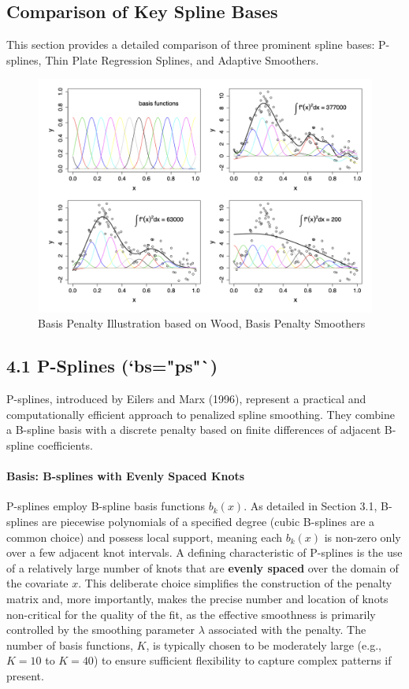 \documentclass[11pt, a4paper]{article}
\begin{document}
\begin{itemize}
\newpage
\section{Comparison of Key Spline Bases}
This section provides a detailed comparison of three prominent spline bases: P-splines, Thin Plate Regression Splines, and Adaptive Smoothers.

\begin{figure}
 \centering
 \includegraphics[width=\linewidth]{basis-penalty-illustration.png}
 \caption{Basis Penalty Illustration based on Wood, Basis Penalty Smoothers}
 \label{fig:enter-label}
\end{figure}
\subsection{4.1 P-Splines (`bs="ps"`)}
P-splines, introduced by Eilers and Marx (1996), represent a practical and computationally efficient approach to penalized spline smoothing. They combine a B-spline basis with a discrete penalty based on finite differences of adjacent B-spline coefficients.

\paragraph{Basis: B-splines with Evenly Spaced Knots}
P-splines employ B-spline basis functions $b_k(x)$. As detailed in Section 3.1, B-splines are piecewise polynomials of a specified degree (cubic B-splines are a common choice) and possess local support, meaning each $b_k(x)$ is non-zero only over a few adjacent knot intervals.
A defining characteristic of P-splines is the use of a relatively large number of knots that are \textbf{evenly spaced} over the domain of the covariate $x$. This deliberate choice simplifies the construction of the penalty matrix and, more importantly, makes the precise number and location of knots non-critical for the quality of the fit, as the effective smoothness is primarily controlled by the smoothing parameter $\lambda$ associated with the penalty. The number of basis functions, $K$, is typically chosen to be moderately large (e.g., $K=10$ to $K=40$) to ensure sufficient flexibility to capture complex patterns if present. 


\end{itemize}
\end{document}
